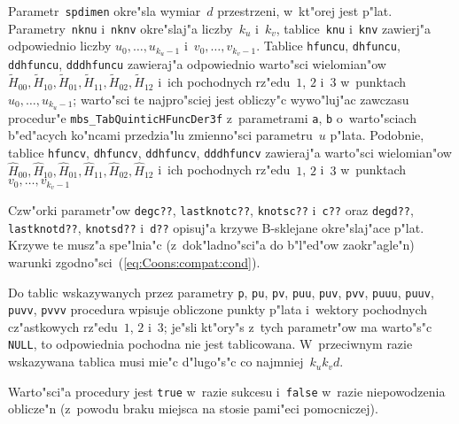 Parametr~\texttt{spdimen} okre"sla wymiar~$d$ przestrzeni, w~kt"orej jest
p"lat. Pa\-ra\-met\-ry~\texttt{nknu} i~\texttt{nknv} okre"slaj"a liczby~$k_u$
i~$k_v$, tablice~\texttt{knu} i~\texttt{knv}
zawierj"a odpowiednio liczby $u_0,\ldots,u_{k_u-1}$ i~$v_0,\ldots,v_{k_v-1}$.
Tablice \texttt{hfuncu}, \texttt{dhfuncu}, \texttt{ddhfuncu}, \texttt{dddhfuncu}
zawieraj"a odpowiednio warto"sci wielomian"ow
$\tilde{H}_{00},\tilde{H}_{10},\tilde{H}_{01},\tilde{H}_{11},%
\tilde{H}_{02},\tilde{H}_{12}$ i~ich pochodnych rz"edu~$1$, $2$ i~$3$
w~punktach $u_0,\ldots,u_{k_u-1}$; warto"sci te najpro"sciej jest obliczy"c
wywo"luj"ac zawczasu procedur"e \texttt{mbs\_TabQuinticHFuncDer3f}
z~parametrami \texttt{a}, \texttt{b} o~warto"sciach b"ed"acych ko"ncami
przedzia"lu zmienno"sci parametru~$u$ p"lata. Podobnie, tablice
\texttt{hfuncv}, \texttt{dhfuncv}, \texttt{ddhfuncv}, \texttt{dddhfuncv}
zawieraj"a warto"sci wielomian"ow $\hat{H}_{00},\hat{H}_{10},%
\hat{H}_{01},\hat{H}_{11},\hat{H}_{02},\hat{H}_{12}$
i~ich pochodnych rz"edu~$1$, $2$ i~$3$ w~punktach $v_0,\ldots,v_{k_v-1}$

Czw"orki parametr"ow \texttt{degc??}, \texttt{lastknotc??}, \texttt{knotsc??}
i~\texttt{c??} oraz \texttt{degd??}, \texttt{lastknotd??}, \texttt{knotsd??}
i~\texttt{d??} opisuj"a krzywe B-sklejane okre"slaj"ace p"lat.
Krzywe te musz"a spe"lnia"c (z~dok"ladno"sci"a do b"l"ed"ow zaokr"agle"n)
warunki zgodno"sci~(\ref{eq:Coons:compat:cond}).

Do tablic wskazywanych przez parametry \texttt{p}, \texttt{pu}, \texttt{pv},
\texttt{puu}, \texttt{puv}, \texttt{pvv}, \texttt{puuu}, \texttt{puuv},
\texttt{puvv}, \texttt{pvvv} procedura wpisuje obliczone punkty
p"lata i~wektory pochodnych cz"astkowych rz"edu~$1$, $2$ i~$3$; je"sli kt"ory"s
z~tych parametr"ow ma warto"s"c \texttt{NULL}, to odpowiednia pochodna
nie jest tablicowana. W~przeciwnym razie wskazywana tablica musi mie"c
d"lugo"s"c co najmniej~$k_uk_vd$.

Warto"sci"a procedury jest \texttt{true} w~razie sukcesu i~\texttt{false}
w~razie niepowodzenia oblicze"n (z~powodu braku miejsca na stosie
pami"eci pomocniczej).



